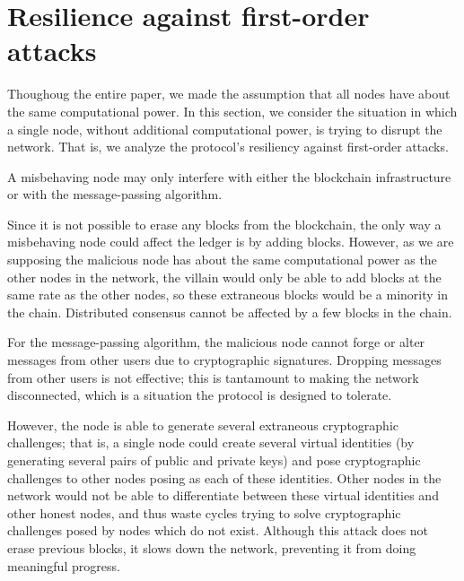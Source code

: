 \section{Resilience against first-order attacks}

Thoughoug the entire paper,
we made the assumption that all nodes have about the same computational power.
In this section,
we consider the situation in which a single node,
without additional computational power,
is trying to disrupt the network.
That is,
we analyze the protocol's resiliency against first-order attacks.

A misbehaving node may only interfere with either the blockchain infrastructure
or with the message-passing algorithm.

Since it is not possible to erase any blocks from the blockchain,
the only way a misbehaving node could affect the ledger
is by adding blocks.
However,
as we are supposing the malicious node
has about the same computational power as the other nodes in the network,
the villain would only be able to add blocks at the same rate as the other nodes,
so these extraneous blocks would be a minority in the chain.
Distributed consensus cannot be affected by a few blocks in the chain.

For the message-passing algorithm,
the malicious node cannot forge or alter messages from other users
due to cryptographic signatures.
Dropping messages from other users is not effective;
this is tantamount to making the network disconnected,
which is a situation the protocol is designed to tolerate.

However,
the node is able to generate several extraneous cryptographic challenges;
that is,
a single node could create several virtual identities
(by generating several pairs of public and private keys)
and pose cryptographic challenges to other nodes posing as each of these identities.
Other nodes in the network would not be able to differentiate between
these virtual identities and other honest nodes,
and thus waste cycles trying to solve cryptographic challenges
posed by nodes which do not exist.
Although this attack does not erase previous blocks,
it slows down the network,
preventing it from doing meaningful progress.
